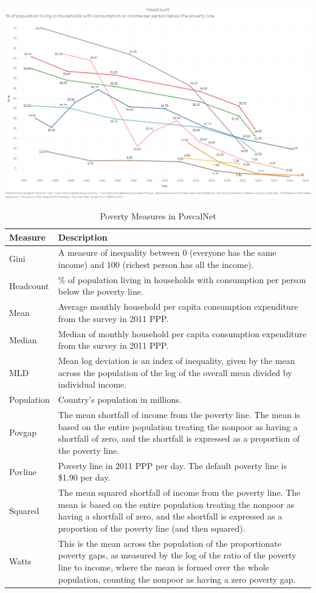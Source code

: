 \documentclass[13 pt,]{book}
\begin{document}
\href{https://tab.worldbank.org/\#/site/WBG/views/SAR_MNA_Poverty/PovcalNet}{\includegraphics{figures/Povcalnet.png}}

\begin{table}[t]

\caption{\label{tab:povcalnet}Poverty Measures in PovcalNet}
\centering
\begin{tabular}{ll}
\toprule
Measure & Description\\
\midrule
Gini & A measure of inequality between 0 (everyone has the same income) and 100 (richest person has all the income).\\
Headcount & \% of population living in households with consumption per person below the poverty line.\\
Mean & Average monthly household per capita consumption expenditure from the survey in 2011 PPP.\\
Median & Median of monthly household per capita consumption expenditure from the survey in 2011 PPP.\\
MLD & Mean log deviation is an index of inequality, given by the mean across the population of the log of the overall mean divided by individual income.\\
\addlinespace
Population & Country's population in millions.\\
Povgap & The mean shortfall of income from the poverty line. The mean is based on the entire population treating the nonpoor as having a shortfall of zero, and the shortfall is expressed as a proportion of the poverty line.\\
Povline & Poverty line in 2011 PPP per day. The default poverty line is \$1.90 per day.\\
Squared & The mean squared shortfall of income from the poverty line. The mean is based on the entire population treating the nonpoor as having a shortfall of zero, and the shortfall is expressed as a proportion of the poverty line (and then squared).\\
Watts & This is the mean across the population of the proportionate poverty gaps, as measured by the log of the ratio of the poverty line to income, where the mean is formed over the whole population, counting the nonpoor as having a zero poverty gap.\\
\bottomrule
\end{tabular}
\end{table}
\end{document}
